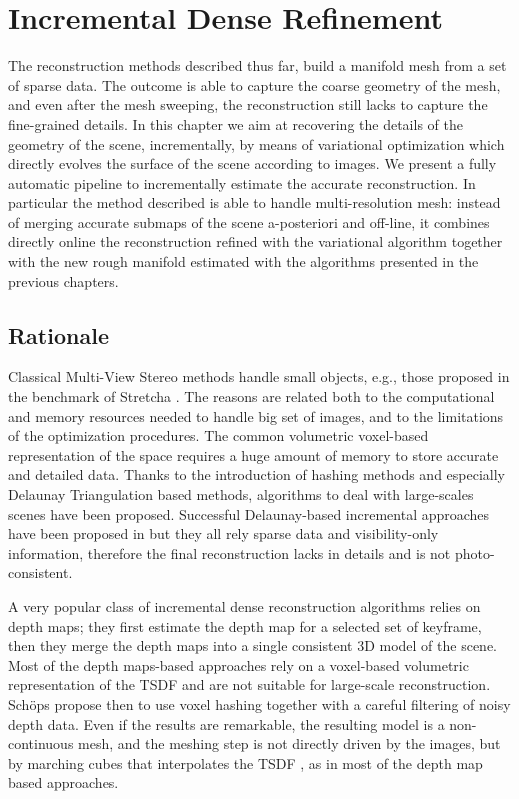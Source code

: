 \chapter{Incremental Dense Refinement}
\label{ch:incrDenseRef}
The reconstruction methods described thus far, build a manifold mesh from a set of sparse data. 
The outcome is able to capture the coarse geometry of the mesh, and even after the mesh sweeping, the reconstruction still lacks to capture the fine-grained details.
In this chapter we aim at recovering the details of the geometry of the scene, incrementally, by means of variational optimization which directly evolves the surface of the scene according to images. 
We present a fully automatic pipeline to incrementally estimate the accurate reconstruction. In particular the method described is able to handle multi-resolution mesh: instead of merging accurate submaps of the scene a-posteriori and off-line, it combines directly online the reconstruction refined with the variational algorithm together with the new rough manifold estimated with the algorithms presented in the previous chapters.

\minitoc
\newpage

\section{Rationale}

Classical Multi-View Stereo methods \cite{gargallo2005bayesian,delaunoy_et_al_08} handle small objects, e.g., those proposed in the benchmark of Stretcha \etal \cite{strecha2006combined}.
The reasons are related both to the computational and memory resources needed to handle big set of images, and to the limitations of the optimization procedures.
The common volumetric voxel-based representation of the space requires a huge amount of memory to store accurate and detailed data.
Thanks to the introduction of hashing methods and especially  Delaunay Triangulation based methods, algorithms to deal with large-scales scenes have been proposed.
Successful Delaunay-based incremental approaches have been proposed in \cite{lovi_et_al_11,hoppe2013incremental,litvinov_lhuillier_13,romanoni15b,romanoni15a} but they all rely sparse data and visibility-only information, therefore the final reconstruction lacks in details and is not photo-consistent.


A very popular class of  incremental dense reconstruction algorithms relies on depth maps; they first estimate the depth map for a selected set of keyframe, then they merge the depth maps into a single consistent 3D model of the scene. 
Most of the depth maps-based approaches \cite{pollefeys_et_al_08,collins1996space,newcombe2010live,ohtake2003multi,stuhmer2012parallel,stuckler2014multi} rely on a voxel-based volumetric representation of the TSDF and are not suitable for large-scale reconstruction. 
Sch{\"o}ps \etal \cite{schops20153d} propose then to use voxel hashing together with a careful filtering of noisy depth data.
Even if the results are remarkable, the resulting model is a non-continuous mesh, and the meshing step is not directly driven by the images, but by marching cubes \cite{lorensen1987marching} that interpolates the TSDF , as in most of the depth map based approaches.

